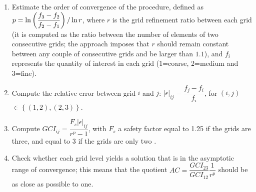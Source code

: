 \begin{enumerate}
	\item  Estimate the order of convergence of the procedure, defined as
	$p = \ln \left( \dfrac{f_3 - f_2}{f_2 - f_1} \right)   / \ln r $,
	where $r$ is the grid refinement ratio between each grid (it is computed as the ratio between the number of elements of two consecutive grids; the approach imposes that $r$ should remain constant between any couple of consecutive grids and be larger than $1.1$), and $f_i$
	represents the quantity of interest in each grid (1=coarse, 2=medium and
	3=fine).
	
	\item Compute the relative error between grid $i$ and $j$:
	${|\epsilon|}_{ij} = \dfrac{f_j - f_i}{f_i}$, for $(i,j)$
	$\in \left\{ (1,2), (2,3) \right\}$.
	
	\item Compute
	$ {GCI}_{ij}=\dfrac{F_s {|\epsilon|}_{ij}}{r^p -1}$, with
	$F_s$ a safety factor equal to 1.25 if the grids are three, and equal to 3 if the grids are only two \citet{roache}.
	
	\item Check whether each grid level yields a solution that is in the asymptotic range of convergence; this means that the quotient
	$ AC = \dfrac{{GCI}_{23}}{{GCI}_{12}} \dfrac{1}{r^p}$ should be as close as possible to one.
\end{enumerate}


